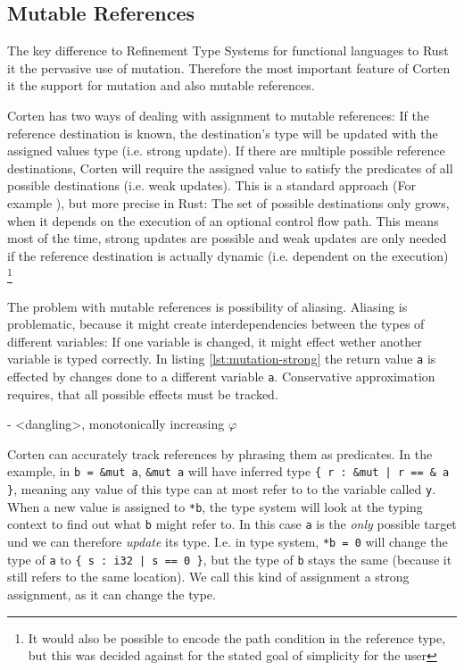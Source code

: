 \documentclass{book}
\newcommand{\code}[1]{\texttt{#1}}
\theoremstyle{definition}
\begin{document}
\label{subsec:mutable-references}\subsection{Mutable References}

The key difference to Refinement Type Systems for functional languages to Rust it the pervasive use of mutation. Therefore the most important feature of Corten it the support for mutation and also mutable references.

Corten has two ways of dealing with assignment to mutable references: If the reference destination is known, the destination's type will be updated with the assigned values type (i.e. strong update). If there are multiple possible reference destinations, Corten will require the assigned value to satisfy the predicates of all possible destinations (i.e. weak updates). This is a standard approach (For example \cite{kloos_asynchronous_2015}), but more precise in Rust: The set of possible destinations only grows, when it depends on the execution of an optional control flow path. This means most of the time, strong updates are possible and weak updates are only needed if the reference destination is actually dynamic (i.e. dependent on the execution) \footnote{It would also be possible to encode the path condition in the reference type, but this was decided against for the stated goal of simplicity for the user}

The problem with mutable references is possibility of aliasing. Aliasing is problematic, because it might create interdependencies between the types of different variables: If one variable is changed, it might effect wether another variable is typed correctly. In listing \ref{lst:mutation-strong} the return value \code{a} is effected by changes done to a different variable \code{a}. Conservative approximation requires, that all possible effects must be tracked.

- <dangling>, monotonically increasing $\varphi$

Corten can accurately track references by phrasing them as predicates.
In the example, in \code{b = \&mut a}, \code{\&mut a} will have inferred type \code{\{ r : \&mut | r == \& a \}}, meaning any value of this type can at most refer to to the variable called \code{y}.
When a new value is assigned to \code{*b}, the type system will look at the typing context to find out what \code{b} might refer to. In this case \code{a} is the \textit{only} possible target und we can therefore \textit{update} its type. I.e. in type system, \code{*b = 0} will change the type of \code{a} to \code{\{ s : i32 | s == 0 \}}, but the type of \code{b} stays the same (because it still refers to the same location). We call this kind of assignment a strong assignment, as it can change the type. 
\end{document}
